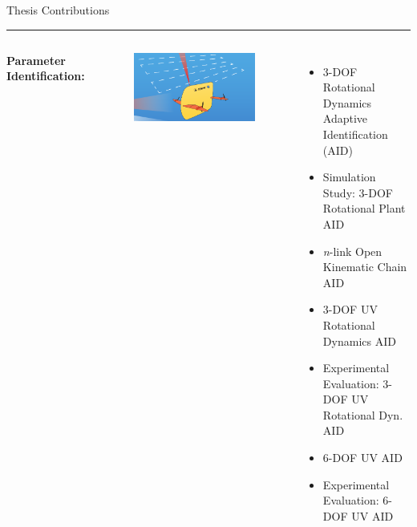 \begin{frame}{Thesis Contributions}
{{\color{OliveGreen}\rule{\linewidth}{4pt}
\vspace*{-5mm}
   \begin{columns}
{\bf Parameter Identification:}
      \begin{figure}[t!]
        \begin{center}
          \includegraphics[width=\textwidth]{./pres/images/justSentry}
        \end{center}
      \end{figure}
\begin{itemize}
\item 3-DOF Rotational Dynamics Adaptive Identification (AID)
\item<1> Simulation Study: 3-DOF Rotational Plant AID
\item<1> {\it n}-link Open Kinematic Chain AID 
\item<1> 3-DOF UV Rotational Dynamics AID
\item<1> Experimental Evaluation: 3-DOF UV Rotational Dyn. AID
\item 6-DOF UV AID
\item Experimental Evaluation: 6-DOF UV AID
   \end{itemize}%
\end{columns}}

}
\end{frame}

